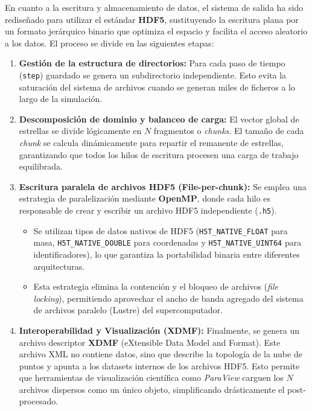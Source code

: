 En cuanto a la escritura y almacenamiento de datos, el sistema de salida ha sido rediseñado para utilizar el estándar \textbf{HDF5}, sustituyendo la escritura plana por un formato jerárquico binario que optimiza el espacio y facilita el acceso aleatorio a los datos.
El proceso se divide en las siguientes etapas:

\begin{enumerate}
    \item \textbf{Gestión de la estructura de directorios:}
    Para cada paso de tiempo (\texttt{step}) guardado se genera un subdirectorio independiente.
    Esto evita la saturación del sistema de archivos cuando se generan miles de ficheros a lo largo de la simulación.

    \item \textbf{Descomposición de dominio y balanceo de carga:}
    El vector global de estrellas se divide lógicamente en \(N\) fragmentos o \textit{chunks}.
    El tamaño de cada \textit{chunk} se calcula dinámicamente para repartir el remanente de estrellas, garantizando que todos los hilos de escritura procesen una carga de trabajo equilibrada.

    \item \textbf{Escritura paralela de archivos HDF5 (File-per-chunk):}
    Se emplea una estrategia de paralelización mediante \textbf{OpenMP}, donde cada hilo es responsable de crear y escribir un archivo HDF5 independiente (\texttt{.h5}).
    \begin{itemize}
        \item Se utilizan tipos de datos nativos de HDF5 (\texttt{H5T\_NATIVE\_FLOAT} para masa, \texttt{H5T\_NATIVE\_DOUBLE} para coordenadas y \texttt{H5T\_NATIVE\_UINT64} para identificadores), lo que garantiza la portabilidad binaria entre diferentes arquitecturas.
        \item Esta estrategia elimina la contención y el bloqueo de archivos (\textit{file locking}), permitiendo aprovechar el ancho de banda agregado del sistema de archivos paralelo (Lustre) del supercomputador.
    \end{itemize}

    \item \textbf{Interoperabilidad y Visualización (XDMF):}
    Finalmente, se genera un archivo descriptor \textbf{XDMF} (eXtensible Data Model and Format).
    Este archivo XML no contiene datos, sino que describe la topología de la nube de puntos y apunta a los datasets internos de los archivos HDF5. Esto permite que herramientas de visualización científica como \textit{ParaView} carguen los \(N\) archivos dispersos como un único objeto, simplificando drásticamente el post-procesado.
\end{enumerate}

